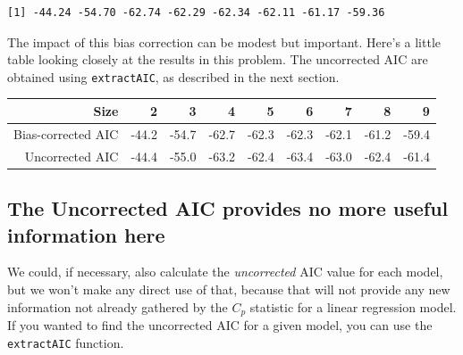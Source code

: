 \documentclass[]{book}
\newenvironment{Shaded}{\begin{snugshade}}{\end{snugshade}}
\newcommand{\KeywordTok}[1]{\textcolor[rgb]{0.13,0.29,0.53}{\textbf{#1}}}
\newcommand{\DecValTok}[1]{\textcolor[rgb]{0.00,0.00,0.81}{#1}}
\newcommand{\StringTok}[1]{\textcolor[rgb]{0.31,0.60,0.02}{#1}}
\newcommand{\CommentTok}[1]{\textcolor[rgb]{0.56,0.35,0.01}{\textit{#1}}}
\newcommand{\OperatorTok}[1]{\textcolor[rgb]{0.81,0.36,0.00}{\textbf{#1}}}
\newcommand{\NormalTok}[1]{#1}
\theoremstyle{definition}
\theoremstyle{definition}
\theoremstyle{definition}
\theoremstyle{remark}
\begin{document}
\begin{Shaded}
\end{Shaded}

\begin{verbatim}
[1] -44.24 -54.70 -62.74 -62.29 -62.34 -62.11 -61.17 -59.36
\end{verbatim}

The impact of this bias correction can be modest but important. Here's a
little table looking closely at the results in this problem. The
uncorrected AIC are obtained using \texttt{extractAIC}, as described in
the next section.

\begin{longtable}[]{@{}rrrrrrrrr@{}}
\toprule
Size & 2 & 3 & 4 & 5 & 6 & 7 & 8 & 9\tabularnewline
\midrule
\endhead
Bias-corrected AIC & -44.2 & -54.7 & -62.7 & -62.3 & -62.3 & -62.1 &
-61.2 & -59.4\tabularnewline
Uncorrected AIC & -44.4 & -55.0 & -63.2 & -62.4 & -63.4 & -63.0 & -62.4
& -61.4\tabularnewline
\bottomrule
\end{longtable}

\subsection{The Uncorrected AIC provides no more useful information
here}\label{the-uncorrected-aic-provides-no-more-useful-information-here}

We could, if necessary, also calculate the \emph{uncorrected} AIC value
for each model, but we won't make any direct use of that, because that
will not provide any new information not already gathered by the \(C_p\)
statistic for a linear regression model. If you wanted to find the
uncorrected AIC for a given model, you can use the \texttt{extractAIC}
function.
\end{document}
